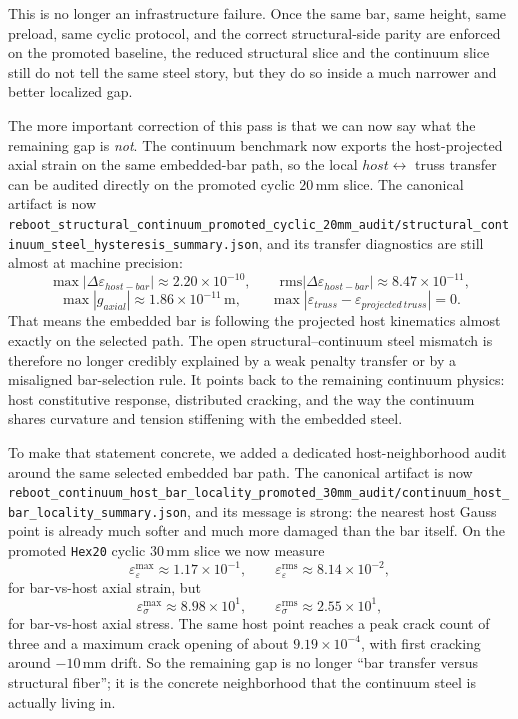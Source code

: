 This is no longer an infrastructure failure. Once the same bar, same height,
same preload, same cyclic protocol, and the correct structural-side parity are
enforced on the promoted baseline, the reduced structural slice and the
continuum slice still do not tell the same steel story, but they do so inside a
much narrower and better localized gap.

The more important correction of this pass is that we can now say what the
remaining gap is \emph{not}.  The continuum benchmark now exports the
host-projected axial strain on the same embedded-bar path, so the local
\(host \leftrightarrow\) truss transfer can be audited directly on the
promoted cyclic \(20\,\mathrm{mm}\) slice.  The canonical artifact is now
\texttt{reboot\_structural\_continuum\_promoted\_cyclic\_20mm\_audit/structural\_continuum\_steel\_hysteresis\_summary.json},
and its transfer diagnostics are still almost at machine precision:
\[
\max |\Delta \varepsilon_{host-bar}| \approx 2.20\times10^{-10}, \qquad
\mathrm{rms} |\Delta \varepsilon_{host-bar}| \approx 8.47\times10^{-11},
\]
\[
\max |g_{axial}| \approx 1.86\times10^{-11}\,\mathrm{m}, \qquad
\max |\varepsilon_{truss}-\varepsilon_{projected\ truss}| = 0.
\]
That means the embedded bar is following the projected host kinematics almost
exactly on the selected path.  The open structural--continuum steel mismatch is
therefore no longer credibly explained by a weak penalty transfer or by a
misaligned bar-selection rule.  It points back to the remaining continuum
physics: host constitutive response, distributed cracking, and the way the
continuum shares curvature and tension stiffening with the embedded steel.

To make that statement concrete, we added a dedicated host-neighborhood audit
around the same selected embedded bar path.  The canonical artifact is now
\texttt{reboot\_continuum\_host\_bar\_locality\_promoted\_30mm\_audit/continuum\_host\_bar\_locality\_summary.json},
and its message is strong: the nearest host Gauss point is already much softer
and much more damaged than the bar itself.  On the promoted \texttt{Hex20}
cyclic \(30\,\mathrm{mm}\) slice we now measure
\[
\varepsilon_{\varepsilon}^{\max} \approx 1.17\times10^{-1}, \qquad
\varepsilon_{\varepsilon}^{\mathrm{rms}} \approx 8.14\times10^{-2},
\]
for bar-vs-host axial strain, but
\[
\varepsilon_{\sigma}^{\max} \approx 8.98\times10^{1}, \qquad
\varepsilon_{\sigma}^{\mathrm{rms}} \approx 2.55\times10^{1},
\]
for bar-vs-host axial stress.  The same host point reaches a peak crack count
of three and a maximum crack opening of about
\(9.19\times10^{-4}\), with first cracking around
\(-10\,\mathrm{mm}\) drift.  So the remaining gap is no longer
``bar transfer versus structural fiber''; it is the concrete neighborhood that
the continuum steel is actually living in.

